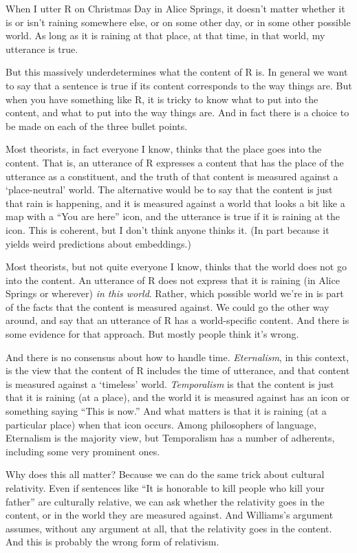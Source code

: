 \documentclass[
]{article}
\begin{document}
When I utter R on Christmas Day in Alice Springs, it doesn't matter
whether it is or isn't raining somewhere else, or on some other day, or
in some other possible world. As long as it is raining at that place, at
that time, in that world, my utterance is true.

But this massively underdetermines what the content of R is. In general
we want to say that a sentence is true if its content corresponds to the
way things are. But when you have something like R, it is tricky to know
what to put into the content, and what to put into the way things are.
And in fact there is a choice to be made on each of the three bullet
points.

Most theorists, in fact everyone I know, thinks that the place goes into
the content. That is, an utterance of R expresses a content that has the
place of the utterance as a constituent, and the truth of that content
is measured against a `place-neutral' world. The alternative would be to
say that the content is just that rain is happening, and it is measured
against a world that looks a bit like a map with a ``You are here''
icon, and the utterance is true if it is raining at the icon. This is
coherent, but I don't think anyone thinks it. (In part because it yields
weird predictions about embeddings.)

Most theorists, but not quite everyone I know, thinks that the world
does not go into the content. An utterance of R does not express that it
is raining (in Alice Springs or wherever) \emph{in this world}. Rather,
which possible world we're in is part of the facts that the content is
measured against. We could go the other way around, and say that an
utterance of R has a world-specific content. And there is some evidence
for that approach. But mostly people think it's wrong.

And there is no consensus about how to handle time. \emph{Eternalism},
in this context, is the view that the content of R includes the time of
utterance, and that content is measured against a `timeless' world.
\emph{Temporalism} is that the content is just that it is raining (at a
place), and the world it is measured against has an icon or something
saying ``This is now.'' And what matters is that it is raining (at a
particular place) when that icon occurs. Among philosophers of language,
Eternalism is the majority view, but Temporalism has a number of
adherents, including some very prominent ones.

Why does this all matter? Because we can do the same trick about
cultural relativity. Even if sentences like ``It is honorable to kill
people who kill your father'' are culturally relative, we can ask
whether the relativity goes in the content, or in the world they are
measured against. And Williams's argument assumes, without any argument
at all, that the relativity goes in the content. And this is probably
the wrong form of relativism.
\end{document}
